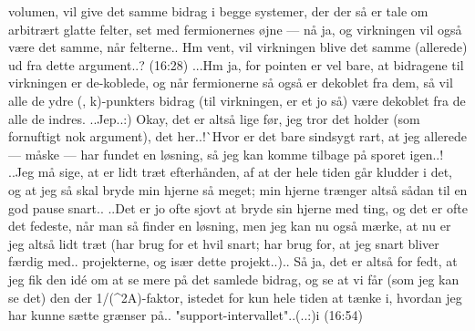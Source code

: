 \documentclass{report}
\begin{document}
volumen, vil give det samme bidrag i begge systemer, der der så er tale om arbitrært glatte felter, set med fermionernes øjne --- nå ja, og virkningen vil også være det samme, når felterne.. Hm vent, vil virkningen blive det samme (allerede) ud fra dette argument..? (16:28) ...Hm ja, for pointen er vel bare, at bidragene til virkningen er de-koblede, og når fermionerne så også er dekoblet fra dem, så vil alle de ydre (\omega, k)-punkters bidrag (til virkningen, er et jo så) være dekoblet fra de alle de indres. ..Jep..:) Okay, det er altså lige før, jeg tror det holder (som fornuftigt nok argument), det her..!^^ Hvor er det bare sindsygt rart, at jeg allerede --- måske --- har fundet en løsning, så jeg kan komme tilbage på sporet igen..! ..Jeg må sige, at er lidt træt efterhånden, af at der hele tiden går kludder i det, og at jeg så skal bryde min hjerne så meget; min hjerne trænger altså sådan til en god pause snart.. ..Det er jo ofte sjovt at bryde sin hjerne med ting, og det er ofte det fedeste, når man så finder en løsning, men jeg kan nu også mærke, at nu er jeg altså lidt træt (har brug for et hvil snart; har brug for, at jeg snart bliver færdig med.. projekterne, og især dette projekt..).. Så ja, det er altså for fedt, at jeg fik den idé om at se mere på det samlede bidrag, og se at vi får (som jeg kan se det) den der 1/(\omega^2\tilde A)-faktor, istedet for kun hele tiden at tænke i, hvordan jeg har kunne sætte grænser på.. "support-intervallet"..(..:)^^) (16:54)
\end{document}
